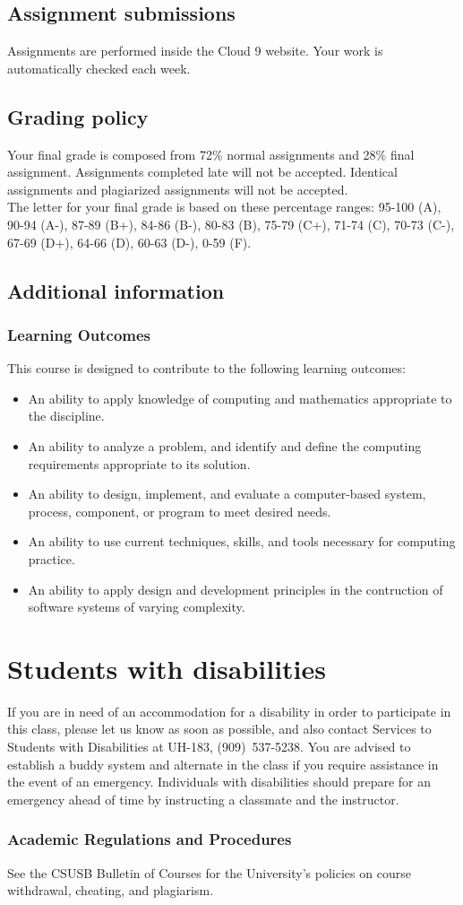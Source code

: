 \documentclass[a4paper,12pt]{article}
\begin{document}
	\subsection*{Assignment submissions}
	Assignments are performed inside the Cloud 9 website. Your work is automatically checked each week.
	\subsection*{Grading policy}
	Your final grade is composed from 72\% normal assignments and 28\% final assignment. Assignments completed late will not be accepted. Identical assignments and plagiarized assignments will not be accepted. \\
	
	The letter for your final grade is based on these percentage ranges: 95-100 (A), 90-94 (A-), 87-89 (B+), 84-86 (B-), 80-83 (B), 75-79 (C+), 71-74 (C), 70-73 (C-), 67-69 (D+), 64-66 (D), 60-63 (D-), 0-59 (F). \\
	\newpage
	\subsection*{Additional information}
	\subsubsection*{Learning Outcomes}
	This course is designed to contribute to the following learning outcomes:
	\begin{itemize}
		\item An ability to apply knowledge of computing and mathematics appropriate to the discipline.
		\item An ability to analyze a problem, and identify and define the computing requirements appropriate to its solution.
		\item An ability to design, implement, and evaluate a computer-based system, process, component, or program to meet desired needs.
		\item An ability to use current techniques, skills, and tools necessary for computing practice.
		\item An ability to apply design and development principles in the contruction of software systems of varying complexity.
	\end{itemize}
	\section*{Students with disabilities}
	{
	\large
	If you are in need of an accommodation for a disability in order to participate in this class, please let us know as soon as possible, and also contact Services to Students with Disabilities at UH-183, \mbox{(909) 537-5238}. You are advised to establish a buddy system and alternate in the class if you require assistance in the event of an emergency. Individuals with disabilities should prepare for an emergency ahead of time by instructing a classmate and the instructor.
	}
	\subsubsection*{Academic Regulations and Procedures}
	See the CSUSB Bulletin of Courses for the University's policies on course withdrawal, cheating, and plagiarism.
\end{document}
